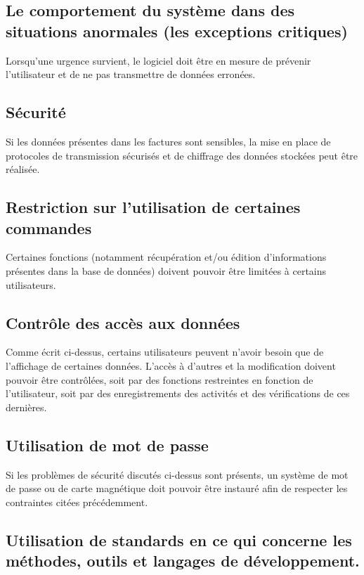 \subsection{Le comportement du système dans des situations anormales (les exceptions critiques)}

Lorsqu’une urgence survient, le logiciel doit être en mesure de prévenir l’utilisateur et de ne pas transmettre de données erronées. 

\subsection{Sécurité}

Si les données présentes dans les factures sont sensibles, la mise en place de protocoles de transmission sécurisés et de chiffrage des données stockées peut être réalisée.

\subsection{Restriction sur l'utilisation de certaines commandes}

Certaines fonctions (notamment récupération et/ou édition d’informations présentes dans la base de données) doivent pouvoir être limitées à certains utilisateurs.

\subsection{Contrôle des accès aux données}

Comme écrit ci-dessus, certains utilisateurs peuvent n’avoir besoin que de l’affichage de certaines données. L’accès à d’autres et la modification doivent pouvoir être contrôlées, soit par des fonctions restreintes en fonction de l'utilisateur, soit par des enregistrements des activités et des vérifications de ces dernières.

\subsection{Utilisation de mot de passe}

Si les problèmes de sécurité discutés ci-dessus sont présents, un système de mot de passe ou de carte magnétique doit pouvoir être instauré afin de respecter les contraintes citées précédemment.

\subsection{Utilisation de standards en ce qui concerne les méthodes, outils et langages de développement.}

